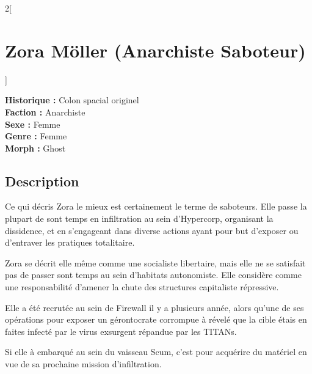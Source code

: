 \documentclass[a4paper,9pt]{article}
\begin{document}
\begin{multicols}{2}[\section*{Zora Möller (Anarchiste Saboteur)}]
   
   \noindent\textbf{Historique :} Colon spacial originel\\
   \noindent\textbf{Faction :} Anarchiste\\
   \noindent\textbf{Sexe :} Femme\\
   \noindent\textbf{Genre :} Femme\\
   \noindent\textbf{Morph :} Ghost\\

   \subsection*{Description}

   Ce qui décris Zora le mieux est certainement le terme de saboteurs.
   Elle passe la plupart de sont temps en infiltration au sein d'Hypercorp,
   organisant la dissidence, et en s'engageant dans diverse actions ayant pour but
   d'exposer ou d'entraver les pratiques totalitaire.
   
   Zora se décrit elle même comme une socialiste libertaire, mais elle ne se satisfait
   pas de passer sont temps au sein d'habitats autonomiste.
   Elle considère comme une responsabilité d'amener la chute des structures capitaliste
   répressive.
   
   Elle a été recrutée au sein de Firewall il y a plusieurs année, alors qu'une de
   ses opérations pour exposer un gérontocrate corrompue à révelé que la cible étais en 
   faites infecté par le virus exsurgent répandue par les TITANs.
   
   Si elle à embarqué au sein du vaisseau Scum, c'est pour acquérire du
   matériel en vue de sa prochaine mission d'infiltration.


\end{multicols}
\end{document}
